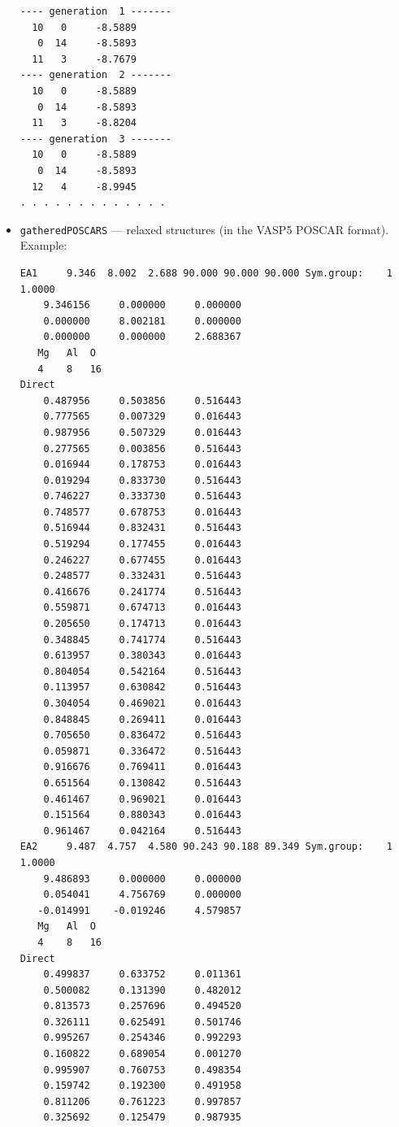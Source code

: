 \documentclass[12pt]{article}
\newcommand{\file}[1]{\texttt{#1}}
\begin{document}
\begin{itemize}
{\tiny
\begin{verbatim}
---- generation  1 -------
  10   0     -8.5889
   0  14     -8.5893
  11   3     -8.7679
---- generation  2 -------
  10   0     -8.5889
   0  14     -8.5893
  11   3     -8.8204
---- generation  3 -------
  10   0     -8.5889
   0  14     -8.5893
  12   4     -8.9945
. . . . . . . . . . . . .
\end{verbatim}
}

\item \file{gatheredPOSCARS} --- relaxed structures (in the VASP5 POSCAR
format). Example:

{\tiny
\begin{verbatim}
EA1     9.346  8.002  2.688 90.000 90.000 90.000 Sym.group:    1
1.0000
    9.346156     0.000000     0.000000
    0.000000     8.002181     0.000000
    0.000000     0.000000     2.688367
   Mg   Al  O
   4    8   16 
Direct
    0.487956     0.503856     0.516443
    0.777565     0.007329     0.016443
    0.987956     0.507329     0.016443
    0.277565     0.003856     0.516443
    0.016944     0.178753     0.016443
    0.019294     0.833730     0.516443
    0.746227     0.333730     0.516443
    0.748577     0.678753     0.016443
    0.516944     0.832431     0.516443
    0.519294     0.177455     0.016443
    0.246227     0.677455     0.016443
    0.248577     0.332431     0.516443
    0.416676     0.241774     0.516443
    0.559871     0.674713     0.016443
    0.205650     0.174713     0.016443
    0.348845     0.741774     0.516443
    0.613957     0.380343     0.016443
    0.804054     0.542164     0.516443
    0.113957     0.630842     0.516443
    0.304054     0.469021     0.016443
    0.848845     0.269411     0.016443
    0.705650     0.836472     0.516443
    0.059871     0.336472     0.516443
    0.916676     0.769411     0.016443
    0.651564     0.130842     0.516443
    0.461467     0.969021     0.016443
    0.151564     0.880343     0.016443
    0.961467     0.042164     0.516443
EA2     9.487  4.757  4.580 90.243 90.188 89.349 Sym.group:    1
1.0000
    9.486893     0.000000     0.000000
    0.054041     4.756769     0.000000
   -0.014991    -0.019246     4.579857
   Mg   Al  O
   4    8   16 
Direct
    0.499837     0.633752     0.011361
    0.500082     0.131390     0.482012
    0.813573     0.257696     0.494520
    0.326111     0.625491     0.501746
    0.995267     0.254346     0.992293
    0.160822     0.689054     0.001270
    0.995907     0.760753     0.498354
    0.159742     0.192300     0.491958
    0.811206     0.761223     0.997857
    0.325692     0.125479     0.987935

\end{verbatim}}
\end{itemize}
\end{document}
